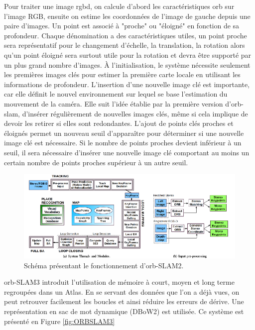\documentclass[11pt]{article}
\begin{document}
          Pour traiter une image \acrshort{rgbd}, on calcule d'abord les caractéristiques \acrshort{orb} sur l'image RGB, ensuite on estime les coordonnées de l'image de 
          gauche depuis une paire d'images. Un point est associé à "proche" ou "éloigné" en fonction de sa profondeur. Chaque dénomination a des
          caractéristiques utiles, un point proche sera représentatif pour le changement d'échelle, la translation, la rotation alors qu'un point éloigné
          sera surtout utile pour la rotation et devra être supporté par un plus grand nombre d'images.
          À l'initialisation, le système nécessite seulement les premières images clés pour estimer la première carte locale en utilisant les informations
          de profondeur. 
          L'insertion d'une nouvelle image clé est importante, car elle définit le nouvel environnement sur lequel se base l'estimation du mouvement 
          de la caméra. Elle suit l'idée établie par la première version d'\acrshort{orb}-\acrshort{slam}, d'insérer régulièrement de nouvelles images clés, 
          même si cela implique de devoir les retirer si elles sont redondantes. L'ajout de points clés proches et éloignés permet un nouveau seuil 
          d'apparaître pour déterminer si une nouvelle image clé est nécessaire. 
          Si le nombre de points proches devient inférieur à un seuil, il sera nécessaire d'insérer une nouvelle image clé comportant au moins un certain
          nombre de points proches supérieur à un autre seuil.

          \begin{figure}[hbt]  
            \includegraphics[width=\textwidth]{ORB_SLAM2.png}    
            \caption{Schéma présentant le fonctionnement d'\acrshort{orb}-SLAM2.}
            \label{fig:ORBSLAM2}
          \end{figure} 

          \acrshort{orb}-SLAM3 introduit l'utilisation de mémoire à court, moyen et long terme regroupées dans un Atlas.
          En se servant des données que l'on a déjà vues, on peut retrouver
          facilement les boucles et ainsi réduire les erreurs de dérive. Une représentation en sac de mot dynamique (DBoW2) est utilisée.
          Ce système est présenté en Figure \ref{fig:ORBSLAM3}
\end{document}

